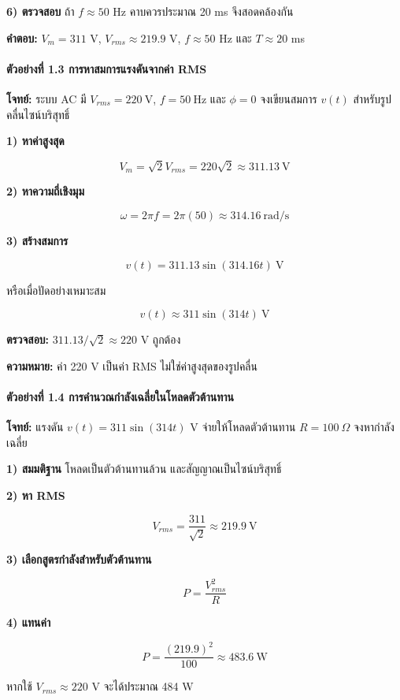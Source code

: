 \textbf{6) ตรวจสอบ}
ถ้า $f\approx50$ Hz คาบควรประมาณ 20 ms จึงสอดคล้องกัน

\textbf{คำตอบ:} $V_m=311$ V, $V_{rms}\approx219.9$ V, $f\approx50$ Hz และ $T\approx20$ ms

 

\paragraph{ตัวอย่างที่ 1.3 การหาสมการแรงดันจากค่า RMS}

\textbf{โจทย์:} ระบบ AC มี $V_{rms}=220\ \mathrm{V}$, $f=50\ \mathrm{Hz}$ และ $\phi=0$ จงเขียนสมการ $v(t)$ สำหรับรูปคลื่นไซน์บริสุทธิ์

\textbf{1) หาค่าสูงสุด}

\[
V_m=\sqrt{2}V_{rms}=220\sqrt{2}\approx311.13\ \mathrm{V}
\]

\textbf{2) หาความถี่เชิงมุม}

\[
\omega=2\pi f=2\pi(50)\approx314.16\ \mathrm{rad/s}
\]

\textbf{3) สร้างสมการ}

\[
v(t)=311.13\sin(314.16t)\ \mathrm{V}
\]

หรือเมื่อปัดอย่างเหมาะสม

\[
v(t)\approx311\sin(314t)\ \mathrm{V}
\]

\textbf{ตรวจสอบ:} $311.13/\sqrt{2}\approx220$ V ถูกต้อง

\textbf{ความหมาย:} ค่า 220 V เป็นค่า RMS ไม่ใช่ค่าสูงสุดของรูปคลื่น

 

\paragraph{ตัวอย่างที่ 1.4 การคำนวณกำลังเฉลี่ยในโหลดตัวต้านทาน}

\textbf{โจทย์:} แรงดัน $v(t)=311\sin(314t)$ V จ่ายให้โหลดตัวต้านทาน $R=100\ \Omega$ จงหากำลังเฉลี่ย

\textbf{1) สมมติฐาน}
โหลดเป็นตัวต้านทานล้วน และสัญญาณเป็นไซน์บริสุทธิ์

\textbf{2) หา RMS}

\[
V_{rms}=\frac{311}{\sqrt{2}}\approx219.9\ \mathrm{V}
\]

\textbf{3) เลือกสูตรกำลังสำหรับตัวต้านทาน}

\[
P=\frac{V_{rms}^2}{R}
\]

\textbf{4) แทนค่า}

\[
P=\frac{(219.9)^2}{100}\approx483.6\ \mathrm{W}
\]

หากใช้ $V_{rms}\approx220$ V จะได้ประมาณ 484 W

